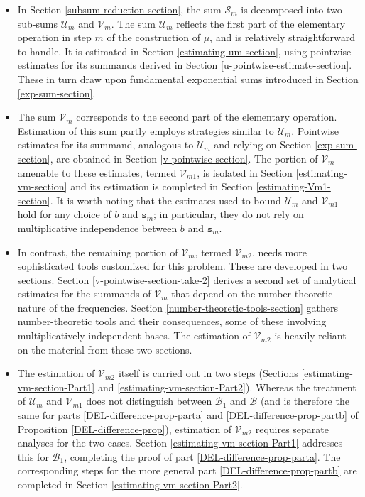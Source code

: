 \documentclass[12pt, twoside]{article}
\def\red{\color{red}}
\theoremstyle{definition}
\numberwithin{equation}{section}
\begin{document}
\begin{itemize} 
\item In Section \ref{subsum-reduction-section}, the sum $\mathcal S_m$ is decomposed into two sub-sums $\mathcal U_m$ and $\mathcal V_m$. The sum $\mathcal U_m$ reflects the first part of the elementary operation in step $m$ of the construction of $\mu$, and is relatively straightforward to handle. It is estimated in Section \ref{estimating-um-section}, using pointwise estimates for its summands derived in Section \ref{u-pointwise-estimate-section}. These in turn draw upon fundamental exponential sums introduced in Section \ref{exp-sum-section}.    
\item The sum $\mathcal V_m$ corresponds to the second part of the elementary operation. Estimation of this sum partly employs strategies similar to $\mathcal U_m$. Pointwise estimates for its summand, analogous to $\mathcal U_m$ and relying on Section \ref{exp-sum-section}, are obtained in Section \ref{v-pointwise-section}. The portion of $\mathcal V_m$ amenable to these estimates, termed $\mathcal V_{m1}$,  is isolated in Section \ref{estimating-vm-section} and its estimation is completed in Section \ref{estimating-Vm1-section}.  It is worth noting that the estimates used to bound $\mathcal U_m$ and $\mathcal V_{m1}$ hold for any choice of $b$ and $\mathtt s_m$; in particular, they do not rely on multiplicative independence between $b$ and $\mathtt s_m$. 
\item In contrast, the remaining portion of $\mathcal V_m$, termed $\mathcal V_{m2}$, needs more sophisticated tools customized for this problem. These are developed in two sections. Section \ref{v-pointwise-section-take-2} derives a second set of analytical estimates for the summands of $\mathcal V_m$ that depend on the number-theoretic nature of the frequencies. Section \ref{number-theoretic-tools-section} gathers number-theoretic tools and their consequences, some of these involving multiplicatively independent bases. The estimation of $\mathcal V_{m2}$ is heavily reliant on the material from these two sections. 
\item The estimation of $\mathcal V_{m2}$ itself is carried out in two steps (Sections \ref{estimating-vm-section-Part1} and \ref{estimating-vm-section-Part2}).  Whereas the treatment of $\mathcal U_m$ and $\mathcal V_{m1}$ does not distinguish between $\mathscr{B}_1$ and $\mathscr{B}$ (and is therefore the same for parts \eqref{DEL-difference-prop-parta} and \eqref{DEL-difference-prop-partb} of Proposition \ref{DEL-difference-prop}), estimation of $\mathcal V_{m2}$ requires separate analyses for the two cases. Section \ref{estimating-vm-section-Part1} addresses this for $\mathscr{B}_1$, completing the proof of part \eqref{DEL-difference-prop-parta}. The corresponding steps for the more general part \eqref{DEL-difference-prop-partb} are completed in Section \ref{estimating-vm-section-Part2}.  
\end{itemize} 
\end{document}
